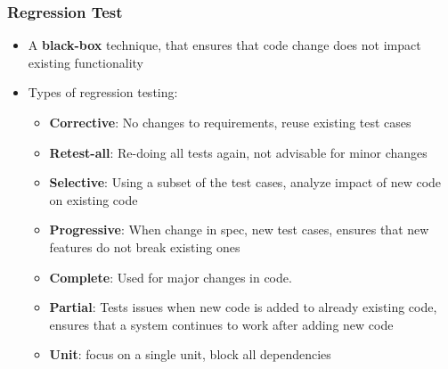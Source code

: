 \documentclass{article}
\begin{document}
\subsubsection{Regression Test}
\begin{itemize}
    \item A \textbf{black-box} technique, that ensures that code change does not impact existing functionality
    
    \item Types of regression testing:
    \begin{itemize}
        \item \textbf{Corrective}: No changes to requirements, reuse existing test cases
        
        \item \textbf{Retest-all}: Re-doing all tests again, not advisable for minor changes
        
        \item \textbf{Selective}: Using a subset of the test cases, analyze impact of new code on existing code
        
        \item \textbf{Progressive}: When change in spec, new test cases, ensures that new features do not break existing ones
        
        \item \textbf{Complete}: Used for major changes in code. 
        
        \item \textbf{Partial}: Tests issues when new code is added to already existing code, ensures that a system continues to work after adding new code
        
        \item \textbf{Unit}: focus on a single unit, block all dependencies

    \end{itemize}
\end{itemize}
\end{document}
